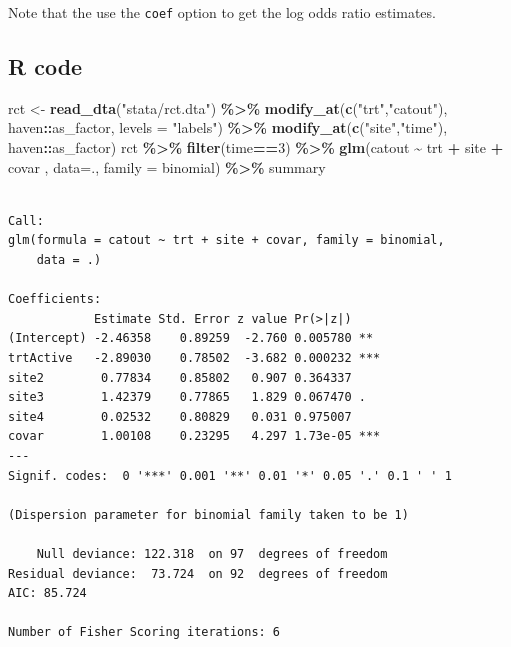 \documentclass[
]{book}
\newenvironment{Shaded}{\begin{snugshade}}{\end{snugshade}}
\newcommand{\AttributeTok}[1]{\textcolor[rgb]{0.13,0.29,0.53}{#1}}
\newcommand{\DecValTok}[1]{\textcolor[rgb]{0.00,0.00,0.81}{#1}}
\newcommand{\FunctionTok}[1]{\textcolor[rgb]{0.13,0.29,0.53}{\textbf{#1}}}
\newcommand{\NormalTok}[1]{#1}
\newcommand{\OtherTok}[1]{\textcolor[rgb]{0.56,0.35,0.01}{#1}}
\newcommand{\SpecialCharTok}[1]{\textcolor[rgb]{0.81,0.36,0.00}{\textbf{#1}}}
\newcommand{\StringTok}[1]{\textcolor[rgb]{0.31,0.60,0.02}{#1}}
\begin{document}
Note that the use the \texttt{coef} option to get the log odds ratio estimates.

\subsection{R code}\label{r-code-1}

\begin{Shaded}
\begin{Highlighting}[]
\NormalTok{rct }\OtherTok{\textless{}{-}} \FunctionTok{read\_dta}\NormalTok{(}\StringTok{"stata/rct.dta"}\NormalTok{) }\SpecialCharTok{\%\textgreater{}\%} 
  \FunctionTok{modify\_at}\NormalTok{(}\FunctionTok{c}\NormalTok{(}\StringTok{"trt"}\NormalTok{,}\StringTok{"catout"}\NormalTok{), haven}\SpecialCharTok{::}\NormalTok{as\_factor, }\AttributeTok{levels =} \StringTok{"labels"}\NormalTok{) }\SpecialCharTok{\%\textgreater{}\%} 
  \FunctionTok{modify\_at}\NormalTok{(}\FunctionTok{c}\NormalTok{(}\StringTok{"site"}\NormalTok{,}\StringTok{"time"}\NormalTok{), haven}\SpecialCharTok{::}\NormalTok{as\_factor)}
\NormalTok{rct }\SpecialCharTok{\%\textgreater{}\%} 
  \FunctionTok{filter}\NormalTok{(time}\SpecialCharTok{==}\DecValTok{3}\NormalTok{) }\SpecialCharTok{\%\textgreater{}\%}
  \FunctionTok{glm}\NormalTok{(catout }\SpecialCharTok{\textasciitilde{}}\NormalTok{ trt }\SpecialCharTok{+}\NormalTok{ site }\SpecialCharTok{+}\NormalTok{ covar , }\AttributeTok{data=}\NormalTok{., }\AttributeTok{family =}\NormalTok{ binomial) }\SpecialCharTok{\%\textgreater{}\%}
\NormalTok{  summary}
\end{Highlighting}
\end{Shaded}

\begin{verbatim}

Call:
glm(formula = catout ~ trt + site + covar, family = binomial, 
    data = .)

Coefficients:
            Estimate Std. Error z value Pr(>|z|)    
(Intercept) -2.46358    0.89259  -2.760 0.005780 ** 
trtActive   -2.89030    0.78502  -3.682 0.000232 ***
site2        0.77834    0.85802   0.907 0.364337    
site3        1.42379    0.77865   1.829 0.067470 .  
site4        0.02532    0.80829   0.031 0.975007    
covar        1.00108    0.23295   4.297 1.73e-05 ***
---
Signif. codes:  0 '***' 0.001 '**' 0.01 '*' 0.05 '.' 0.1 ' ' 1

(Dispersion parameter for binomial family taken to be 1)

    Null deviance: 122.318  on 97  degrees of freedom
Residual deviance:  73.724  on 92  degrees of freedom
AIC: 85.724

Number of Fisher Scoring iterations: 6
\end{verbatim}
\end{document}
